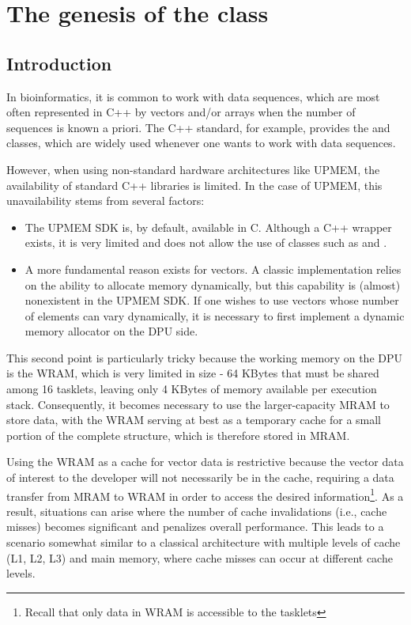 \section{The genesis of the  class}

\subsection{Introduction}
In bioinformatics, it is common to work with data sequences, which are most often represented in C++ by vectors and/or arrays 
when the number of sequences is known a priori. The C++ standard, for example, provides the  and  
classes, which are widely used whenever one wants to work with data sequences.

However, when using non-standard hardware architectures like UPMEM, the availability of standard C++ libraries is limited. 
In the case of UPMEM, this unavailability stems from several factors:
\begin{itemize}
\item The UPMEM SDK is, by default, available in C. Although a C++ wrapper exists, it is very limited and does not allow the use of classes
 such as  and .
\item A more fundamental reason exists for vectors. A classic implementation relies on the ability to allocate memory dynamically, 
but this capability is (almost) nonexistent in the UPMEM SDK. If one wishes to use vectors whose number of elements 
can vary dynamically, it is necessary to first implement a dynamic memory allocator on the DPU side.
\end{itemize}	

This second point is particularly tricky because the working memory on the DPU is the WRAM, which is very limited in size - 64 KBytes
 that must be shared among 16 tasklets, leaving only 4 KBytes of memory available per execution stack. 
 Consequently, it becomes necessary to use the larger-capacity MRAM to store data, with the WRAM serving at best as a temporary 
 cache for a small portion of the complete structure, which is therefore stored in MRAM.

 Using the WRAM as a cache for vector data is restrictive because the vector data of interest to the developer will not necessarily 
 be in the cache, requiring a data transfer from MRAM to WRAM in order to access the desired
  information\footnote{Recall that only data in WRAM is accessible to the tasklets}. 
  As a result, situations can arise where the number of cache invalidations (i.e., cache misses) 
  becomes significant and penalizes overall performance. This leads to a scenario somewhat similar to a classical architecture 
  with multiple levels of cache (L1, L2, L3) and main memory, where cache misses can occur at different cache levels.

